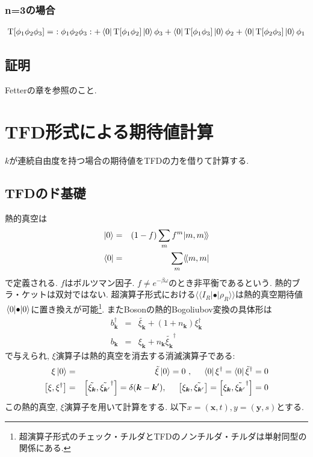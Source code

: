 \documentclass[10.5pt,a4paper]{jreport}
\newcommand{\dket}[1]{| #1 \rangle \! \rangle}
\newcommand{\dbra}[1]{\langle \! \langle #1 |}
\begin{document}
\subsubsection{n=3の場合}
\begin{eqnarray}
  {\rm T}[\phi_1\phi_2\phi_3] =\ :\phi_1\phi_2\phi_3: + \bra{0}{\rm T}[\phi_1\phi_2]\ket{0}\phi_3 + \bra{0}{\rm T}[\phi_1\phi_3]\ket{0}\phi_2 + \bra{0}{\rm T}[\phi_2\phi_3]\ket{0}\phi_1 
\end{eqnarray}
\subsection{証明}
Fetterの章を参照のこと. 
\section{TFD形式による期待値計算}
$k$が連続自由度を持つ場合の期待値をTFDの力を借りて計算する.
\subsection{TFDのド基礎}
熱的真空は
\begin{eqnarray}
  \ket{0} &=& (1-f)\sum_mf^m\dket{m, m}\\
  \bra{0} &=& \sum_m\dbra{m, m}
\end{eqnarray}
で定義される. $f$はボルツマン因子. $f \neq e^{-\beta\omega}$のとき非平衡であるという. 熱的ブラ・ケットは双対ではない.
超演算子形式における$\dbra{I_R}\bullet\dket{\rho_R}$は熱的真空期待値$\ev{\bullet}{0}$に置き換えが可能\footnote{超演算子形式のチェック・チルダとTFDのノンチルダ・チルダは単射同型の関係にある. }. またBosonの熱的Bogoliubov変換の具体形は
\begin{eqnarray}
  b_{\bm{k}}^\dagger &=& \tilde{\xi_{\bm{k}}} + (1+n_{\bm{k}})\xi_{\bm{k}}^\dagger\\
  b_{\bm{k}} &=& \xi_{\bm{k}} + n_{\bm{k}}\tilde{\xi_{\bm{k}}}^\dagger
\end{eqnarray}
で与えられ, $\xi$演算子は熱的真空を消去する消滅演算子である:
\begin{eqnarray}
  \xi\ket{0} &=& \tilde{\xi}\ket{0} = 0\ ,\hspace{0.5cm} \bra{0}\xi^\dagger = \bra{0}\tilde{\xi}^\dagger = 0\\
  \comm{\xi}{\xi^\dagger} &=& \comm{\tilde{\xi_{\bm{k}}}}{\tilde{\xi_{\bm{k}'}}^\dagger} = \delta(\bm{k}-\bm{k}'), \hspace{0.5cm} \comm{\xi_{\bm{k}}}{\tilde{\xi_{\bm{k}'}}} = \comm{\xi_{\bm{k}}}{\tilde{\xi_{\bm{k}'}}^\dagger} = 0
\end{eqnarray}
この熱的真空, $\xi$演算子を用いて計算をする. 以下$x = (\bm{x}, t), y = (\bm{y}, s)$とする. 
\end{document}

